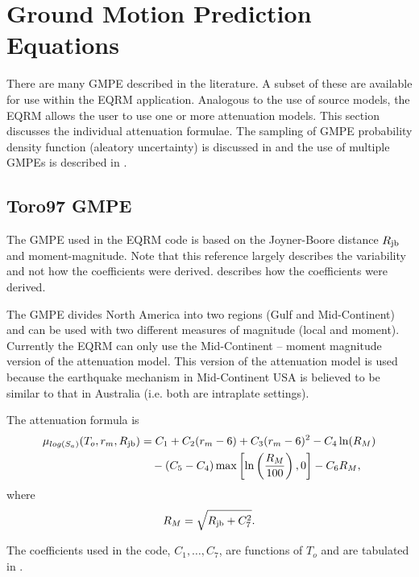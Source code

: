 \section{Ground Motion Prediction Equations}
\label{attn:atten-formula}


There are many GMPE described in the literature. A subset of these
are available for use within the EQRM application. Analogous to the
use of source models, the EQRM allows the user to use one or more
attenuation models. This section discusses the individual
attenuation formulae. The sampling of GMPE probability density
function (aleatory uncertainty) is discussed in
 and the use of multiple GMPEs is described
in .


\subsection{Toro97 GMPE}

The \citet{dr_Toro97a} GMPE used in the EQRM code is based on the
Joyner-Boore distance $\Rjb$ and moment-magnitude. Note that this
reference largely describes the variability and not how the
coefficients were derived. \citet{dr_EPRI93a} describes how the
coefficients were derived.

The \citet{dr_Toro97a} GMPE divides North America into two regions
(Gulf and Mid-Continent) and can  be used with two different
measures of magnitude (local and moment). Currently the EQRM can
only use the Mid-Continent -- moment magnitude version of the
attenuation model. This version of the attenuation model is used
because the earthquake mechanism in Mid-Continent USA is believed to
be similar to that in Australia (i.e. both are intraplate settings).


The attenuation formula is
\begin{equation}
\begin{split}
\mu_{log(S_a)}(T_o,r_m,\Rjb) &= C_1 + C_2(r_m-6) + C_3(r_m-6)^2 - C_4\ln(R_M) \\
       &\quad  - (C_5-C_4)\max\left[\ln\left(\frac{R_M}{100}\right),0\right] -C_6R_M,
\end{split}
\end{equation}
where
\begin{equation}
 R_M = \sqrt{ \Rjb + C_7^2 }.
\end{equation}

The coefficients used in the code, $C_1,\ldots,C_7$, are functions
of $T_o$ and are tabulated in \citet[Table 2]{dr_Toro97a}.

